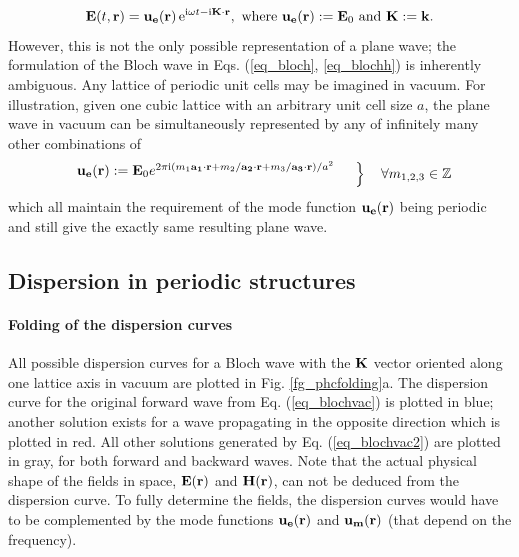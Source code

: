 \begin{equation}  
\mathbf{E}(t, {\mathbf{r}}) = \mathbf{u_e}({\mathbf{r}})\,\mathrm{e}^{{\mathrm i}\omega t - {\mathrm i}{\mathbf{K}}\cdot{\mathbf{r}}}, \text{ where } \mathbf{u_e}({\mathbf{r}}) := \mathbf{E}_0  \text{ and } {\mathbf{K}} := {\mathbf{k}}.
\label{eq_blochvac}
\end{equation}
However, this is not the only possible representation of a plane wave; the formulation of the Bloch wave in Eqs. (\ref{eq_bloch}, \ref{eq_blochh}) is inherently ambiguous. Any lattice of periodic unit cells may be imagined in vacuum. For illustration, given one cubic lattice with an arbitrary unit cell size $a$, %
the plane wave in vacuum can be simultaneously represented by any of infinitely many other combinations of
\begin{equation} 
\left.  \begin{array}{cc}
	\mathbf{u_{e}}(\rr) := \E_0 e^{2\pi\ii (m_1\ava\cdot\rr + m_2/\avb\cdot\rr + m_3/\avc\cdot\rr)/a^{2}} \vspace{2mm} \\ %
\end{array}\quad \right\} \quad \forall m_{1,2,3} \in \mathbb{Z}
\label{eq_blochvac2}
\end{equation}
which all maintain the requirement of the mode function $\mathbf{u_{e}}({\mathbf{r}})$ being periodic and still give the exactly same resulting plane wave. 

\subsection{Dispersion in periodic structures}
\paragraph{Folding of the dispersion curves} %
All possible dispersion curves for a Bloch wave with the ${\mathbf{K}}$ vector oriented along one lattice axis in vacuum are plotted in Fig. \ref{fg_phcfolding}a. The dispersion curve for the original forward wave from Eq. (\ref{eq_blochvac}) is plotted in blue; another solution exists for a wave propagating in the opposite direction which is plotted in red. All other solutions generated by Eq. (\ref{eq_blochvac2}) are plotted in gray, for both forward and backward waves. 
Note that the actual physical shape of the fields in space,  $\mathbf{E}({\mathbf{r}})$ and $\mathbf{H}({\mathbf{r}})$, can not be deduced from the dispersion curve. To fully determine the fields, the dispersion curves would have to be complemented by the mode functions $\mathbf{u_e}({\mathbf{r}})$ and $\mathbf{u_m}({\mathbf{r}})$ (that depend on the frequency). 

